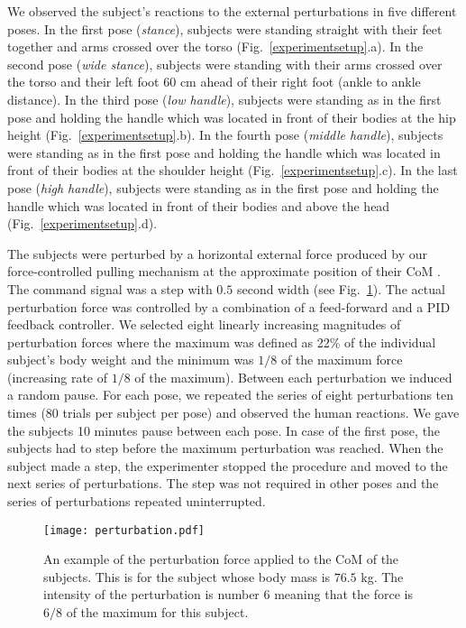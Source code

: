 We observed the subject’s reactions to the external perturbations in five different poses. In the first pose (\textit{stance}), subjects were standing straight with their feet together and arms crossed over the torso (Fig.~\ref{experimentsetup}.a). In the second pose (\textit{wide stance}), subjects were standing with their arms crossed over the torso and their left foot $60$ cm ahead of their right foot (ankle to ankle distance). In the third pose (\textit{low handle}), subjects were standing as in the first pose and holding the handle which was located in front of their bodies at the hip height (Fig.~\ref{experimentsetup}.b). In the fourth pose (\textit{middle handle}), subjects were standing as in the first pose and holding the handle which was located in front of their bodies at the shoulder height (Fig.~\ref{experimentsetup}.c). In the last pose (\textit{high handle}), subjects were standing as in the first pose and holding the handle which was located in front of their bodies and above the head (Fig.~\ref{experimentsetup}.d).

The subjects were perturbed by a horizontal external force produced by our force-controlled pulling mechanism \cite{Peternel&Babic13} at the approximate position of their CoM \cite{Gardetal04}. The command signal was a step with $0.5$ second width (see Fig.~\ref{perturbations}). The actual perturbation force was controlled by a combination of a feed-forward and a PID feedback controller. We selected eight linearly increasing magnitudes of perturbation forces where the maximum was defined as 22\% of the individual subject's body weight and the minimum was $1/8$ of the maximum force (increasing rate of $1/8$ of the maximum). Between each perturbation we induced a random pause. For each pose, we repeated the series of eight perturbations ten times (80 trials per subject per pose) and observed the human reactions. We gave the subjects 10 minutes pause between each pose. In case of the first pose, the subjects had to step before the maximum perturbation was reached. When the
subject made a step, the experimenter stopped the procedure and moved to the next series of perturbations. The step was not required in other poses and the series of perturbations repeated uninterrupted.
\begin{figure}
	\centering
	\texttt{[image: perturbation.pdf]}
	\caption{An example of the perturbation force applied to the CoM of the subjects. This is for the subject whose body mass is $76.5$ kg. The intensity of the perturbation is number $6$ meaning that the force is 	$6/8$ of the maximum for this subject.}
	\label{perturbations}
\end{figure}

